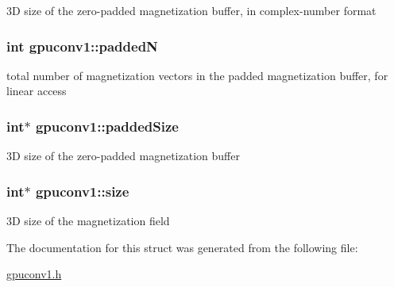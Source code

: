 3D size of the zero-\/padded magnetization buffer, in complex-\/number format 

\hypertarget{structgpuconv1_a215ec34d5e22137ac25b7b89c6c08e77}{
\subsubsection[{paddedN}]{\setlength{\rightskip}{0pt plus 5cm}int {\bf gpuconv1::paddedN}}}
\label{structgpuconv1_a215ec34d5e22137ac25b7b89c6c08e77}


total number of magnetization vectors in the padded magnetization buffer, for linear access 

\hypertarget{structgpuconv1_a5039ec622cc217c4ba86b85b394a7cfa}{
\subsubsection[{paddedSize}]{\setlength{\rightskip}{0pt plus 5cm}int$\ast$ {\bf gpuconv1::paddedSize}}}
\label{structgpuconv1_a5039ec622cc217c4ba86b85b394a7cfa}


3D size of the zero-\/padded magnetization buffer 

\hypertarget{structgpuconv1_a8d75f07579c54db1a3930c3a5aca64ed}{
\subsubsection[{size}]{\setlength{\rightskip}{0pt plus 5cm}int$\ast$ {\bf gpuconv1::size}}}
\label{structgpuconv1_a8d75f07579c54db1a3930c3a5aca64ed}


3D size of the magnetization field 



The documentation for this struct was generated from the following file:\begin{DoxyCompactItemize}
\item 
\hyperlink{gpuconv1_8h}{gpuconv1.h}\end{DoxyCompactItemize}
